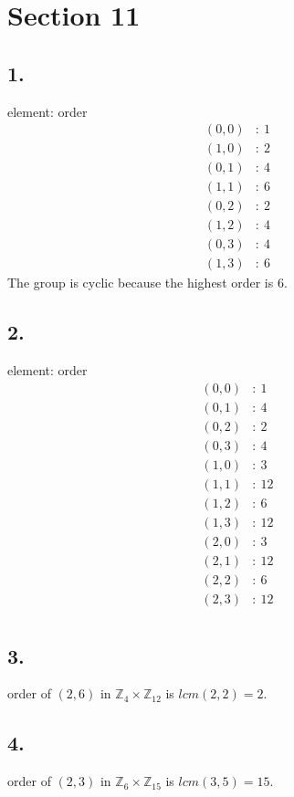 \documentclass{article}
\begin{document}
\section*{Section 11}
\subsection*{1. }
element: order\\
\begin{align*}
	(0, 0)&:\ 1\\
	(1, 0)&:\ 2\\
	(0, 1)&:\ 4\\
	(1, 1)&:\ 6\\
	(0, 2)&:\ 2\\
	(1, 2)&:\ 4\\
	(0, 3)&:\ 4\\
	(1, 3)&:\ 6
\end{align*}
The group is cyclic because the highest order is 6.

\subsection*{2. }
element: order\\
\begin{align*}
	(0, 0)&:\ 1\\
	(0, 1)&:\ 4\\
	(0, 2)&:\ 2\\
	(0, 3)&:\ 4\\
	(1, 0)&:\ 3\\
	(1, 1)&:\ 12\\
	(1, 2)&:\ 6\\
	(1, 3)&:\ 12\\
	(2, 0)&:\ 3\\
	(2, 1)&:\ 12\\
	(2, 2)&:\ 6\\
	(2, 3)&:\ 12\\
\end{align*}

\subsection*{3. }
order of $(2,6)$ in $\mathbb{Z}_4 \times \mathbb{Z}_{12}$ is $lcm(2,2) = 2$.

\subsection*{4. }
order of $(2,3)$ in $\mathbb{Z}_6 \times \mathbb{Z}_{15}$ is $lcm(3,5) = 15$.
\end{document}
